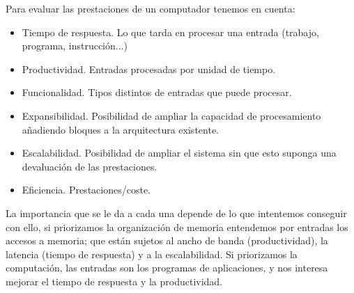 \documentclass[a4paper, 11pt]{article}
\begin{document}
 
Para evaluar las prestaciones de un computador tenemos en cuenta:
\begin{itemize}
	\item Tiempo de respuesta. Lo que tarda en procesar una entrada (trabajo, programa, instrucción...) 
	\item Productividad. Entradas procesadas por unidad de tiempo. 
	\item Funcionalidad. Tipos distintos de entradas que puede procesar. 
	\item Expansibilidad. Posibilidad de ampliar la capacidad de procesamiento añadiendo bloques a la arquitectura existente.
	\item Escalabilidad. Posibilidad de ampliar el sistema sin que esto suponga una devaluación de las prestaciones. 
	\item Eficiencia. Prestaciones/coste. 
\end{itemize}
La importancia que se le da a cada una depende de lo que intentemos conseguir con ello, si priorizamos la organización de memoria entendemos por entradas los accesos a memoria; que están sujetos al ancho de banda (productividad), la latencia (tiempo de respuesta) y a la escalabilidad. Si priorizamos la computación, las entradas son los programas de aplicaciones, y nos interesa mejorar el tiempo de respuesta y la productividad. 
\end{document}
